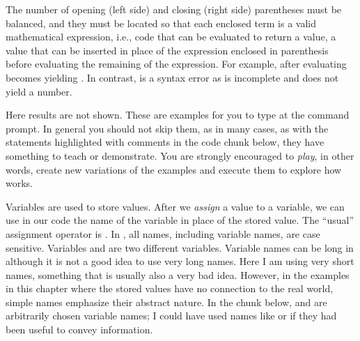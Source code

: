 \documentclass[krantz2]{krantz}\usepackage{knitr}
\begin{document}
The number of opening (left side) and closing (right side) parentheses must be balanced, and they must be located so that each enclosed term is a valid mathematical expression, i.e., code that can be evaluated to return a value, a value that can be inserted in place of the expression enclosed in parenthesis before evaluating the remaining of the expression. For example,  after evaluating  becomes  yielding . In contrast,  is a syntax error as  is incomplete and does not yield a number.

\begin{playground}
Here results are not shown. These are examples for you to type at the command prompt. In general you should not skip them, as in many cases, as with the statements highlighted with comments in the code chunk below, they have something to teach or demonstrate. You are strongly encouraged to \emph{play}, in other words, create new variations of the examples and execute them to explore how \Rlang works.

\begin{knitrout}\footnotesize
{}\color{fgcolor}\begin{kframe}
\begin{alltt}
 \hlopt{+} 
 \hlopt{*} 
 \hlopt{+}  \hlopt{/} 
\hlstd{(} \hlopt{+} \hlstd{)} \hlopt{/} 
\hlopt{^} \hlopt{+} 
\hlstd{(}\hlstd{)}
 
  \hlstd{=} \hlstd{)}
 
\hlstd{(}\hlstd{)}
\hlstd{(}\hlstd{)}
\hlstd{(}\hlstd{)}
\hlstd{(}\hlstd{)}
\end{alltt}
\end{kframe}
\end{knitrout}

\end{playground}

Variables are used to store values. After we \emph{assign} a value to a variable, we can use in our code the name of the variable in place of the stored value. The ``usual'' assignment operator is \Roperator{<-}. In \Rlang, all names, including variable names, are case sensitive. Variables  and  are two different variables. Variable names can be long in \Rlang although it is not a good idea to use very long names. Here I am using very short names, something that is usually also a very bad idea. However, in the examples in this chapter where the stored values have no connection to the real world, simple names emphasize their abstract nature. In the chunk below,  and  are arbitrarily chosen variable names; I could have used names like  or  if they had been useful to convey information.
\end{document}
